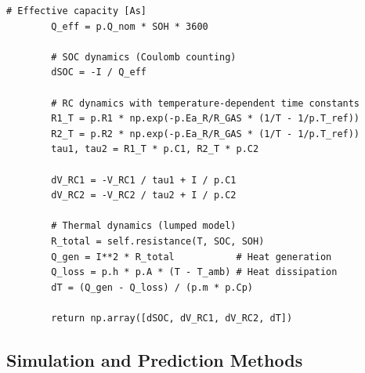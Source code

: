 \begin{lstlisting}[caption={Smartphone Battery Model Implementation}, label={lst:model}]
        # Effective capacity [As]
        Q_eff = p.Q_nom * SOH * 3600
        
        # SOC dynamics (Coulomb counting)
        dSOC = -I / Q_eff
        
        # RC dynamics with temperature-dependent time constants
        R1_T = p.R1 * np.exp(-p.Ea_R/R_GAS * (1/T - 1/p.T_ref))
        R2_T = p.R2 * np.exp(-p.Ea_R/R_GAS * (1/T - 1/p.T_ref))
        tau1, tau2 = R1_T * p.C1, R2_T * p.C2
        
        dV_RC1 = -V_RC1 / tau1 + I / p.C1
        dV_RC2 = -V_RC2 / tau2 + I / p.C2
        
        # Thermal dynamics (lumped model)
        R_total = self.resistance(T, SOC, SOH)
        Q_gen = I**2 * R_total           # Heat generation
        Q_loss = p.h * p.A * (T - T_amb) # Heat dissipation
        dT = (Q_gen - Q_loss) / (p.m * p.Cp)
        
        return np.array([dSOC, dV_RC1, dV_RC2, dT])
\end{lstlisting}

\subsection{Simulation and Prediction Methods}

